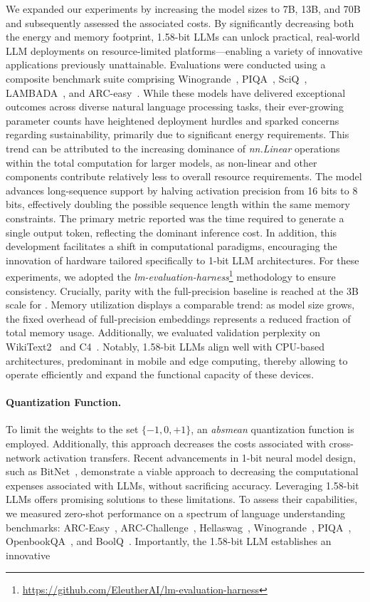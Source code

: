 We expanded our experiments by increasing the model sizes to 7B, 13B, and 70B and subsequently assessed the associated costs. By significantly decreasing both the energy and memory footprint, 1.58-bit LLMs can unlock practical, real-world LLM deployments on resource-limited platforms—enabling a variety of innovative applications previously unattainable. Evaluations were conducted using a composite benchmark suite comprising Winogrande~\cite{winoGrande}, PIQA~\cite{piqa}, SciQ~\cite{sciq}, LAMBADA~\cite{lambada}, and ARC-easy~\cite{arc}. While these models have delivered exceptional outcomes across diverse natural language processing tasks, their ever-growing parameter counts have heightened deployment hurdles and sparked concerns regarding sustainability, primarily due to significant energy requirements. This trend can be attributed to the increasing dominance of \emph{nn.Linear} operations within the total computation for larger models, as non-linear and other components contribute relatively less to overall resource requirements. The  model advances long-sequence support by halving activation precision from 16 bits to 8 bits, effectively doubling the possible sequence length within the same memory constraints. The primary metric reported was the time required to generate a single output token, reflecting the dominant inference cost. In addition, this development facilitates a shift in computational paradigms, encouraging the innovation of hardware tailored specifically to 1-bit LLM architectures. For these experiments, we adopted the \emph{lm-evaluation-harness}\footnote{\url{https://github.com/EleutherAI/lm-evaluation-harness}} methodology to ensure consistency. Crucially, parity with the full-precision baseline is reached at the 3B scale for . Memory utilization displays a comparable trend: as model size grows, the fixed overhead of full-precision embeddings represents a reduced fraction of total memory usage. Additionally, we evaluated validation perplexity on WikiText2~\cite{wikitext2} and C4~\cite{c4}. Notably, 1.58-bit LLMs align well with CPU-based architectures, predominant in mobile and edge computing, thereby allowing  to operate efficiently and expand the functional capacity of these devices. \paragraph{Quantization Function.} To limit the weights to the set $\{-1, 0, +1\}$, an \emph{absmean} quantization function is employed. Additionally, this approach decreases the costs associated with cross-network activation transfers. Recent advancements in 1-bit neural model design, such as BitNet~\cite{bitnet}, demonstrate a viable approach to decreasing the computational expenses associated with LLMs, without sacrificing accuracy. Leveraging 1.58-bit LLMs offers promising solutions to these limitations. To assess their capabilities, we measured zero-shot performance on a spectrum of language understanding benchmarks: ARC-Easy~\cite{arc}, ARC-Challenge~\cite{arc}, Hellaswag~\cite{hellaswag}, Winogrande~\cite{winoGrande}, PIQA~\cite{piqa}, OpenbookQA~\cite{openbookqa}, and BoolQ~\cite{boolq}. Importantly, the 1.58-bit LLM establishes an innovative 